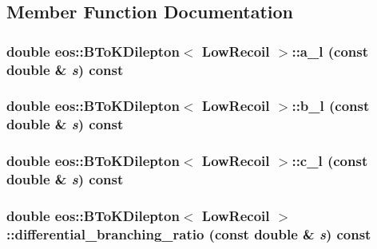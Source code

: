 \subsection{Member Function Documentation}
\hypertarget{classeos_1_1BToKDilepton_3_01LowRecoil_01_4_a8ff826ff49870e2ccf119c2e9d88990b}{
\subsubsection[{a\_\-l}]{\setlength{\rightskip}{0pt plus 5cm}double eos::BToKDilepton$<$ {\bf LowRecoil} $>$::a\_\-l (const double \& {\em s}) const}}
\label{classeos_1_1BToKDilepton_3_01LowRecoil_01_4_a8ff826ff49870e2ccf119c2e9d88990b}
\hypertarget{classeos_1_1BToKDilepton_3_01LowRecoil_01_4_a1562f70f9d51d871d7bb7d05cb6e0158}{
\subsubsection[{b\_\-l}]{\setlength{\rightskip}{0pt plus 5cm}double eos::BToKDilepton$<$ {\bf LowRecoil} $>$::b\_\-l (const double \& {\em s}) const}}
\label{classeos_1_1BToKDilepton_3_01LowRecoil_01_4_a1562f70f9d51d871d7bb7d05cb6e0158}
\hypertarget{classeos_1_1BToKDilepton_3_01LowRecoil_01_4_a09c11f0e15ce93470f54850bbe331745}{
\subsubsection[{c\_\-l}]{\setlength{\rightskip}{0pt plus 5cm}double eos::BToKDilepton$<$ {\bf LowRecoil} $>$::c\_\-l (const double \& {\em s}) const}}
\label{classeos_1_1BToKDilepton_3_01LowRecoil_01_4_a09c11f0e15ce93470f54850bbe331745}
\hypertarget{classeos_1_1BToKDilepton_3_01LowRecoil_01_4_a610b93d6e65a048705a5debd9d9fd912}{
\subsubsection[{differential\_\-branching\_\-ratio}]{\setlength{\rightskip}{0pt plus 5cm}double eos::BToKDilepton$<$ {\bf LowRecoil} $>$::differential\_\-branching\_\-ratio (const double \& {\em s}) const}}
